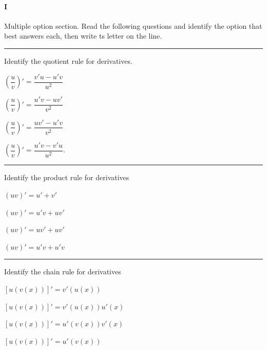 
\paragraph{I} Multiple option section. 
Read the following questions and identify the option that best answers each, then write ts letter on the line.

\begin{preguntas}

\pregunta[4] \rule{1cm}{0.1mm} Identify the quotient rule for derivatives. 

\begin{enumerate*}[label=(\alph*)]
    \item \(\left(\dfrac{u}{v}\right)' = \dfrac{v'u - u'v}{u^2}\)\hspace{2em}
    \item \(\left(\dfrac{u}{v}\right)' = \dfrac{u'v - uv'}{v^2}\) \hspace{2em}
    \item \(\left(\dfrac{u}{v}\right)' = \dfrac{uv' - u'v}{v^2}\) \hspace{2em} 
    \item \(\left(\dfrac{u}{v}\right)' = \dfrac{u'v - v'u}{u^2}\). 
\end{enumerate*}

\pregunta[4] \rule{1cm}{0.1mm} Identify the product rule for derivatives 

\begin{enumerate*}[label=(\alph*)]
    \item \( (uv)' = u' + v' \)\hspace{2em}
    \item \( (uv)' = u'v + uv' \) \hspace{2em}
    \item \( (uv)' = uv' + uv' \)\hspace{2em}
    \item \( (uv)' = u'v + u'v \)
\end{enumerate*}

\pregunta[4] \rule{1cm}{0.1mm} Identify the chain rule for derivatives 

\begin{enumerate*}[label=(\alph*)]
    \item \( \left[u(v(x))\right]' = v'(u(x)) \) \hspace{3em}
    \item \( \left[u(v(x))\right]' = v'(u(x))u'(x) \)
        \\
    \item \( \left[u(v(x))\right]' = u'(v(x))v'(x) \)\hspace{3em}
    \item \( \left[u(v(x))\right]' = u'(v(x)) \)
\end{enumerate*}


\end{preguntas}
